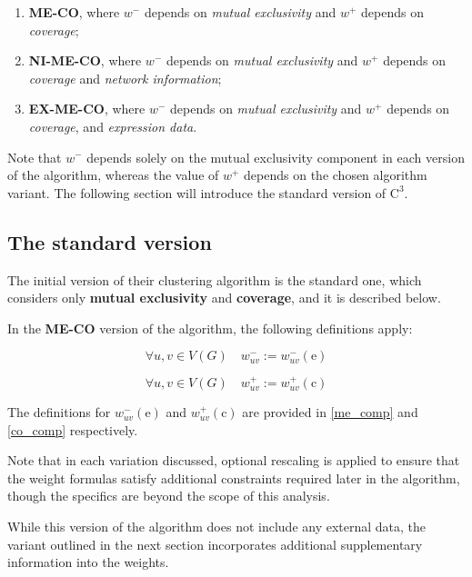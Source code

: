 \begin{enumerate}
    \item \textbf{ME-CO}, where $w^-$ depends on \textit{mutual exclusivity} and $w^+$ depends on \textit{coverage};
    \item \textbf{NI-ME-CO}, where $w^-$ depends on \textit{mutual exclusivity} and $w^+$ depends on \textit{coverage} and \textit{network information};
    \item \textbf{EX-ME-CO}, where $w^-$ depends on \textit{mutual exclusivity} and $w^+$ depends on \textit{coverage}, and \textit{expression data}.
\end{enumerate}

Note that $w^-$ depends solely on the mutual exclusivity component in each version of the algorithm, whereas the value of $w^+$ depends on the chosen algorithm variant. The following section will introduce the standard version of $\mathrm{C}^3$.

\subsection{The standard version}

The initial version of their clustering algorithm is the standard one, which considers only \textbf{mutual exclusivity} and \textbf{coverage}, and it is described below.

\begin{definition}[ME-CO]
    In the \textbf{ME-CO} version of the algorithm, the following definitions apply:

    \begin{equation}
        \forall u, v \in V(G) \quad w_{uv}^- := w^-_{uv}(\mathrm e)
    \end{equation}

    \begin{equation}
        \forall u, v \in V(G) \quad w_{uv}^+ := w^+_{uv}(\mathrm c)
    \end{equation}
\end{definition}

The definitions for $w_{uv}^-(\mathrm e)$ and $w_{uv}^+(\mathrm c)$ are provided in \cref{me_comp} and \cref{co_comp} respectively.

Note that in each variation discussed, optional rescaling is applied to ensure that the weight formulas satisfy additional constraints required later in the algorithm, though the specifics are beyond the scope of this analysis.

While this version of the algorithm does not include any external data, the variant outlined in the next section incorporates additional supplementary information into the weights.

